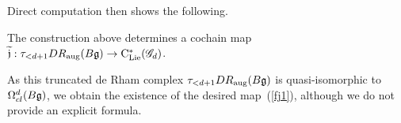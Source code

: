 Direct computation then shows the following.

\begin{lem}
The construction above determines a cochain map $\widetilde{\mathfrak j}: \tau_{<d+1} DR_{\rm aug}(B\mathfrak g) \to {\rm C}_{{\rm Lie}}^*(\mathscr G_d)$.  
\end{lem}

As this truncated de Rham complex $\tau_{<d+1} DR_{\rm aug}(B\mathfrak g)$ is quasi-isomorphic to  $\Omega^d_{cl}(B\mathfrak g)$, 
we obtain the existence of the desired map~(\ref{fj1}),
although we do not provide an explicit formula.



%

%

